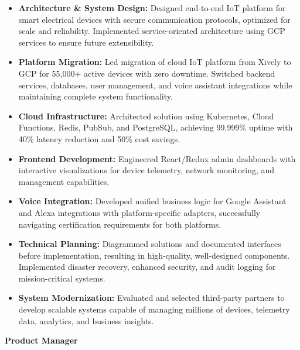\documentclass{fullstackdeveloper-ats}
\begin{document}
\begin{itemize}
    \item \textbf{Architecture \& System Design:} Designed end-to-end IoT platform for smart electrical devices with secure communication protocols, optimized for scale and reliability. Implemented service-oriented architecture using GCP services to ensure future extensibility.
    
    \item \textbf{Platform Migration:} Led migration of cloud IoT platform from Xively to GCP for 55,000+ active devices with zero downtime. Switched backend services, databases, user management, and voice assistant integrations while maintaining complete system functionality.
    
    \item \textbf{Cloud Infrastructure:} Architected solution using Kubernetes, Cloud Functions, Redis, PubSub, and PostgreSQL, achieving 99.999\% uptime with 40\% latency reduction and 50\% cost savings.
    
    \item \textbf{Frontend Development:} Engineered React/Redux admin dashboards with interactive visualizations for device telemetry, network monitoring, and management capabilities.
    
    \item \textbf{Voice Integration:} Developed unified business logic for Google Assistant and Alexa integrations with platform-specific adapters, successfully navigating certification requirements for both platforms.
    
    \item \textbf{Technical Planning:} Diagrammed solutions and documented interfaces before implementation, resulting in high-quality, well-designed components. Implemented disaster recovery, enhanced security, and audit logging for mission-critical systems.
    
    \item \textbf{System Modernization:} Evaluated and selected third-party partners to develop scalable systems capable of managing millions of devices, telemetry data, analytics, and business insights.
\end{itemize}

\vspace{0.2cm}

\noindent\textbf{Product Manager} \hfill {}\\
\end{document}
